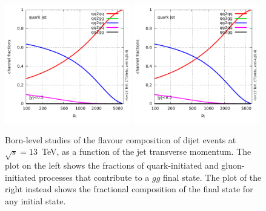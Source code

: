 \begin{figure}
\begin{center}
\includegraphics[width=0.49\textwidth, page=9]{figs/fractions.pdf} \hfill
\includegraphics[width=0.49\textwidth, page=10]{figs/fractions.pdf}
\caption{Born-level studies of the flavour composition of dijet events at $\sqrt{s}=13$~TeV, as a function of the jet transverse momentum. The plot on the left shows the fractions of quark-initiated and gluon-initiated processes that contribute to a $gg$ final state. The plot of the right instead shows the fractional composition of the final state for any initial state.}
\label{fig:born_studies} 
\end{center}
\end{figure}

